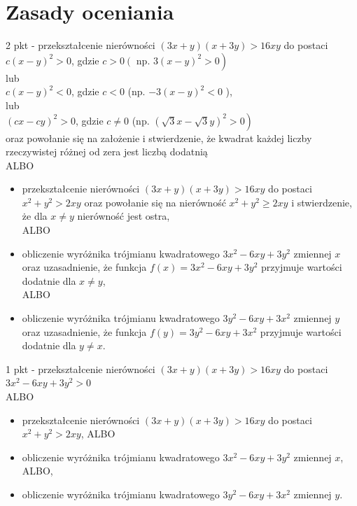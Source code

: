 \documentclass[10pt]{article}
\begin{document}
\section*{Zasady oceniania}
2 pkt - przekształcenie nierówności $(3 x+y)(x+3 y)>16 x y$ do postaci\\
$c(x-y)^{2}>0$, gdzie $c>0\left(\right.$ np. $\left.3(x-y)^{2}>0\right)$\\
lub\\
$c(x-y)^{2}<0$, gdzie $c<0$ (np. $-3(x-y)^{2}<0$ ),\\
lub\\
$(c x-c y)^{2}>0$, gdzie $c \neq 0$ (np. $\left.(\sqrt{3} x-\sqrt{3} y)^{2}>0\right)$\\
oraz powołanie się na założenie i stwierdzenie, że kwadrat każdej liczby rzeczywistej różnej od zera jest liczbą dodatnią\\
ALBO

\begin{itemize}
  \item przekształcenie nierówności $(3 x+y)(x+3 y)>16 x y$ do postaci $x^{2}+y^{2}>2 x y$ oraz powołanie się na nierówność $x^{2}+y^{2} \geq 2 x y$ i stwierdzenie, że dla $x \neq y$ nierówność jest ostra,\\
ALBO
  \item obliczenie wyróżnika trójmianu kwadratowego $3 x^{2}-6 x y+3 y^{2}$ zmiennej $x$ oraz uzasadnienie, że funkcja $f(x)=3 x^{2}-6 x y+3 y^{2}$ przyjmuje wartości dodatnie dla $x \neq y$,\\
ALBO
  \item obliczenie wyróżnika trójmianu kwadratowego $3 y^{2}-6 x y+3 x^{2}$ zmiennej $y$ oraz uzasadnienie, że funkcja $f(y)=3 y^{2}-6 x y+3 x^{2}$ przyjmuje wartości dodatnie dla $y \neq x$.
\end{itemize}

1 pkt - przekształcenie nierówności $(3 x+y)(x+3 y)>16 x y$ do postaci\\
$3 x^{2}-6 x y+3 y^{2}>0$\\
ALBO

\begin{itemize}
  \item przekształcenie nierówności $(3 x+y)(x+3 y)>16 x y$ do postaci $x^{2}+y^{2}>2 x y$, ALBO
  \item obliczenie wyróżnika trójmianu kwadratowego $3 x^{2}-6 x y+3 y^{2}$ zmiennej $x$, ALBO,
  \item obliczenie wyróżnika trójmianu kwadratowego $3 y^{2}-6 x y+3 x^{2}$ zmiennej $y$.
\end{itemize}
\end{document}
